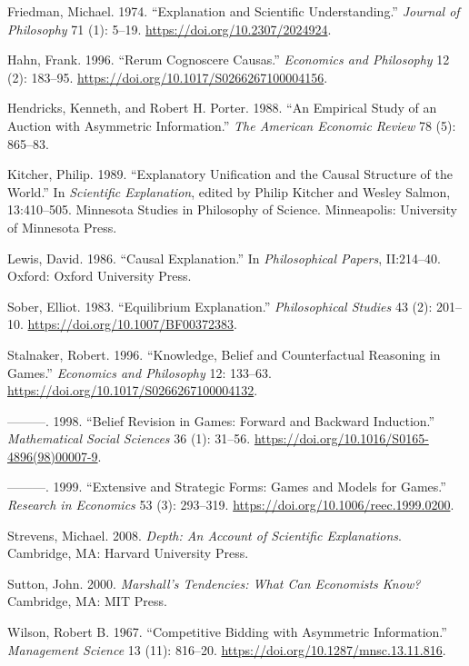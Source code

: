 \documentclass[
  11pt,
  letterpaper,
  DIV=11,
  numbers=noendperiod,
  oneside]{scrartcl}
\newlength{\cslhangindent}
\newenvironment{CSLReferences}[2] %
 {\begin{list}{}{%
  \setlength{\itemindent}{0pt}
  \setlength{\leftmargin}{0pt}
  \setlength{\parsep}{0pt}
  \ifodd #1
   \setlength{\leftmargin}{\cslhangindent}
   \setlength{\itemindent}{-1\cslhangindent}
  \fi
  \setlength{\itemsep}{#2\baselineskip}}}
 {\end{list}}
\begin{document}
\label{refs}
\begin{CSLReferences}{1}{0}
Friedman, Michael. 1974. {``Explanation and Scientific Understanding.''}
\emph{Journal of Philosophy} 71 (1): 5--19.
\url{https://doi.org/10.2307/2024924}.

Hahn, Frank. 1996. {``Rerum Cognoscere Causas.''} \emph{Economics and
Philosophy} 12 (2): 183--95.
\url{https://doi.org/10.1017/S0266267100004156}.

Hendricks, Kenneth, and Robert H. Porter. 1988. {``An Empirical Study of
an Auction with Asymmetric Information.''} \emph{The American Economic
Review} 78 (5): 865--83.

Kitcher, Philip. 1989. {``Explanatory Unification and the Causal
Structure of the World.''} In \emph{Scientific Explanation}, edited by
Philip Kitcher and Wesley Salmon, 13:410--505. Minnesota Studies in
Philosophy of Science. Minneapolis: University of Minnesota Press.

Lewis, David. 1986. {``Causal Explanation.''} In \emph{Philosophical
Papers}, II:214--40. Oxford: Oxford University Press.

Sober, Elliot. 1983. {``Equilibrium Explanation.''} \emph{Philosophical
Studies} 43 (2): 201--10. \url{https://doi.org/10.1007/BF00372383}.

Stalnaker, Robert. 1996. {``Knowledge, Belief and Counterfactual
Reasoning in Games.''} \emph{Economics and Philosophy} 12: 133--63.
\url{https://doi.org/10.1017/S0266267100004132}.

---------. 1998. {``Belief Revision in Games: Forward and Backward
Induction.''} \emph{Mathematical Social Sciences} 36 (1): 31--56.
\url{https://doi.org/10.1016/S0165-4896(98)00007-9}.

---------. 1999. {``Extensive and Strategic Forms: Games and Models for
Games.''} \emph{Research in Economics} 53 (3): 293--319.
\url{https://doi.org/10.1006/reec.1999.0200}.

Strevens, Michael. 2008. \emph{Depth: An Account of Scientific
Explanations}. Cambridge, MA: Harvard University Press.

Sutton, John. 2000. \emph{Marshall's Tendencies: What Can Economists
Know?} Cambridge, MA: {MIT} Press.

Wilson, Robert B. 1967. {``Competitive Bidding with Asymmetric
Information.''} \emph{Management Science} 13 (11): 816--20.
\url{https://doi.org/10.1287/mnsc.13.11.816}.

\end{CSLReferences}
\end{document}
